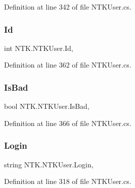 Definition at line 342 of file N\+T\+K\+User.\+cs.

\mbox{\label{class_n_t_k_1_1_n_t_k_user_ae3aabe90eaaeb3444c62c9cd4345a2eb}} 
\subsubsection{\texorpdfstring{Id}{Id}}
{\footnotesize\ttfamily int N\+T\+K.\+N\+T\+K\+User.\+Id\hspace{0.3cm}{\ttfamily [get]}, {\ttfamily [set]}}







Definition at line 362 of file N\+T\+K\+User.\+cs.

\mbox{\label{class_n_t_k_1_1_n_t_k_user_a69f4b6790cfa4e39cee2af0cadbbe746}} 
\subsubsection{\texorpdfstring{IsBad}{IsBad}}
{\footnotesize\ttfamily bool N\+T\+K.\+N\+T\+K\+User.\+Is\+Bad\hspace{0.3cm}{\ttfamily [get]}, {\ttfamily [set]}}







Definition at line 366 of file N\+T\+K\+User.\+cs.

\mbox{\label{class_n_t_k_1_1_n_t_k_user_aa3f210eff4da80300f2c47dc2a95e6d6}} 
\subsubsection{\texorpdfstring{Login}{Login}}
{\footnotesize\ttfamily string N\+T\+K.\+N\+T\+K\+User.\+Login\hspace{0.3cm}{\ttfamily [get]}, {\ttfamily [set]}}







Definition at line 318 of file N\+T\+K\+User.\+cs.

